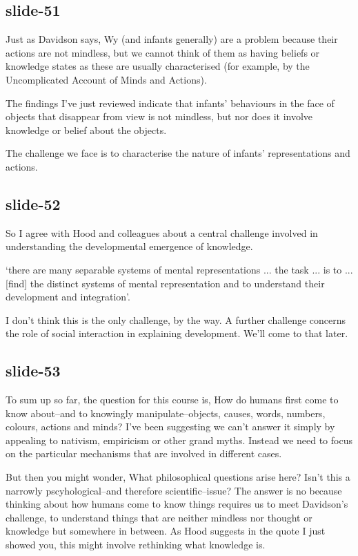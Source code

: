 \documentclass[12pt,\papersize]{extarticle}
\begin{document}
\subsection{slide-51}
Just as Davidson says, Wy (and infants generally) are a problem because
their actions are not mindless, but we cannot think of them as having
beliefs or knowledge states as these are usually characterised
(for example, by the Uncomplicated Account of Minds and Actions).

The findings I’ve just reviewed indicate that infants’ behaviours in the face of
objects that disappear from view is not mindless,
but nor does it involve knowledge or belief about the objects.

The challenge we face is to characterise the nature of infants’ representations
and actions.

\subsection{slide-52}
So I agree with
Hood and colleagues about a central challenge involved in understanding
the developmental emergence of knowledge.

‘there are many separable systems of mental representations ... the task ... is to ... [find] the distinct systems of mental representation and to understand their development and integration’\citep[p.\ 1522]{Hood:2000bf}.

I don’t think this is the only challenge, by the way.
A further challenge concerns the role of social interaction in
explaining development.  We’ll come to that later.

\subsection{slide-53}
To sum up so far, the question for this course is, How do humans first come to know  about--and
to knowingly manipulate--objects, causes, words, numbers, colours, actions and minds?
I've been suggesting we can't answer it simply by appealing to nativism, empiricism or other
grand myths.
Instead we need to focus on the particular mechanisms that are involved in different cases.

But then you might wonder, What philosophical questions arise here?  Isn't this a narrowly
pscyhological--and therefore scientific--issue?
The answer is no because thinking about how humans come to know things requires us to meet
Davidson's challenge, to understand things that are neither mindless nor thought or knowledge
but somewhere in between.
As Hood suggests in the quote I just showed you, this might involve rethinking what knowledge
is.
\end{document}
